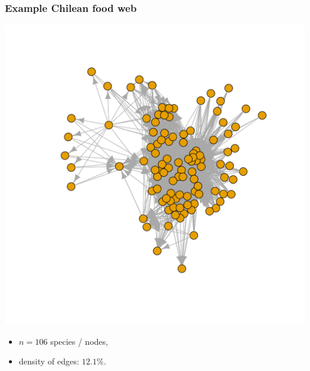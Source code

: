 \documentclass[compress,10pt]{beamer}
\begin{document}


\begin{frame}
 \frametitle{Example Chilean food web}
 
\begin{center}
\includegraphics[scale=.3]{plots/chilean_food_web.pdf} 
\end{center}

\begin{itemize}
 \item $n=106$ species / nodes,
 \item density of edges: $12.1\%$.
\end{itemize}


\textcolor{blue}{\cite{kefi}}

\end{frame}
\end{document}
